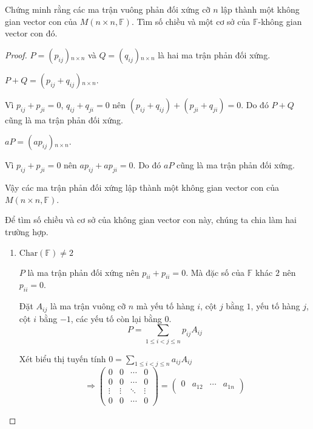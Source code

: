 \documentclass[class=linearalgebra,crop=false]{standalone}
\begin{document}
\begin{exercise}Chứng minh rằng các ma trận vuông phản đối xứng cỡ $n$ lập thành một không gian vector con của $M(n\times n,\mathbb{F})$. Tìm số chiều và một cơ sở của $\mathbb{F}$-không gian vector con đó.
\end{exercise}

\begin{proof}$P = (p_{ij}){}_{n\times n}$ và $Q = (q_{ij}){}_{n\times n}$ là hai ma trận phản đối xứng.
    \par $P + Q = (p_{ij} + q_{ij}){}_{n\times n}$.
    \par Vì $p_{ij} + p_{ji} = 0$, $q_{ij} + q_{ji} = 0$ nên $(p_{ij} + q_{ij}) + (p_{ji} + q_{ji}) = 0$. Do đó $P + Q$ cũng là ma trận phản đối xứng.
    \par $aP = (ap_{ij}){}_{n\times n}$.
    \par Vì $p_{ij} + p_{ji} = 0$ nên $ap_{ij} + ap_{ji} = 0$. Do đó $aP$ cũng là ma trận phản đối xứng.
    \par Vậy các ma trận phản đối xứng lập thành một không gian vector con của $M(n\times n,\mathbb{F})$.
    \par Để tìm số chiều và cơ sở của không gian vector con này, chúng ta chia làm hai trường hợp.
    \begin{enumerate}
        \item $\text{Char}(\mathbb{F})\ne 2$
            \par $P$ là ma trận phản đối xứng nên $p_{ii} + p_{ii} = 0$. Mà đặc số của $\mathbb{F}$ khác $2$ nên $p_{ii} = 0$.
            \par Đặt $A_{ij}$ là ma trận vuông cỡ $n$ mà yếu tố hàng $i$, cột $j$ bằng $1$, yếu tố hàng $j$, cột $i$ bằng $-1$, các yếu tố còn lại bằng $0$.
                \[ P = \sum_{1\le i < j \le n}p_{ij}A_{ij} \]
            \par Xét biểu thị tuyến tính $0 = \displaystyle\sum_{1\le i < j\le n}a_{ij}A_{ij}$
            \[
                \Rightarrow
                \begin{pmatrix}
                    0 & 0 & \cdots & 0 \\
                    0 & 0 & \cdots & 0 \\
                    \vdots & \vdots & \ddots & \vdots \\
                    0 & 0 & \cdots & 0
                \end{pmatrix} =
                \begin{pmatrix}
                    0 & a_{12} & \cdots & a_{1n} \\

\end{pmatrix}\]
\end{enumerate}
\end{proof}
\end{document}
